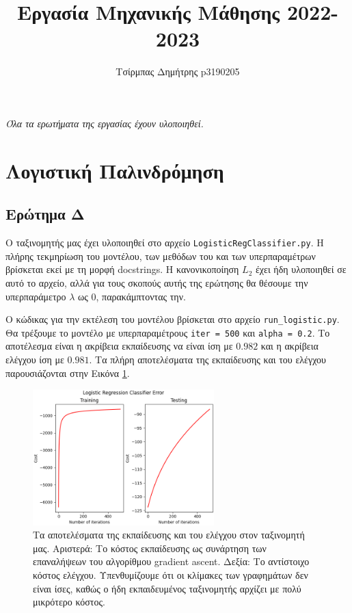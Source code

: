 \documentclass{article}
\title{Εργασία Μηχανικής Μάθησης 2022-2023}
\author{Τσίρμπας Δημήτρης p3190205}
\newcommand{\code}{\texttt}
\begin{document}
	
\maketitle

\textit{Όλα τα ερωτήματα της εργασίας έχουν υλοποιηθεί.}

\section{Λογιστική Παλινδρόμηση}

\subsection{Ερώτημα Δ}
Ο ταξινομητής μας έχει υλοποιηθεί στο αρχείο \code{LogisticRegClassifier.py}. Η πλήρης τεκμηρίωση του μοντέλου, των μεθόδων του και των υπερπαραμέτρων βρίσκεται εκεί με τη μορφή docstrings. Η κανονικοποίηση $L_{2}$ έχει ήδη υλοποιηθεί σε αυτό το αρχείο, αλλά για τους σκοπούς αυτής της ερώτησης θα θέσουμε την υπερπαράμετρο \code{$\lambda$} ως 0, παρακάμπτοντας την.\par

Ο κώδικας για την εκτέλεση του μοντέλου βρίσκεται στο αρχείο \code{run\_logistic.py}. Θα τρέξουμε το μοντέλο με υπερπαραμέτρους \code{iter = 500} και \code{alpha = 0.2}. Το αποτέλεσμα είναι η ακρίβεια εκπαίδευσης να είναι ίση με $0.982$ και η ακρίβεια ελέγχου ίση με $0.981$. Τα πλήρη αποτελέσματα της εκπαίδευσης και του ελέγχου παρουσιάζονται στην Εικόνα \ref{logistic_train_test}.

\begin{figure}
	\includegraphics[width=7cm]{logistic_error.png}
	\centering
	\caption{Τα αποτελέσματα της εκπαίδευσης και του ελέγχου στον ταξινομητή μας. Αριστερά: Το κόστος εκπαίδευσης ως συνάρτηση των επαναλήψεων του αλγορίθμου gradient ascent. Δεξία: Το αντίστοιχο κόστος ελέγχου. Υπενθυμίζουμε ότι οι κλίμακες των γραφημάτων δεν είναι ίσες, καθώς ο ήδη εκπαιδευμένος ταξινομητής αρχίζει με πολύ μικρότερο κόστος. }
	\label{logistic_train_test}
\end{figure}
\end{document}
